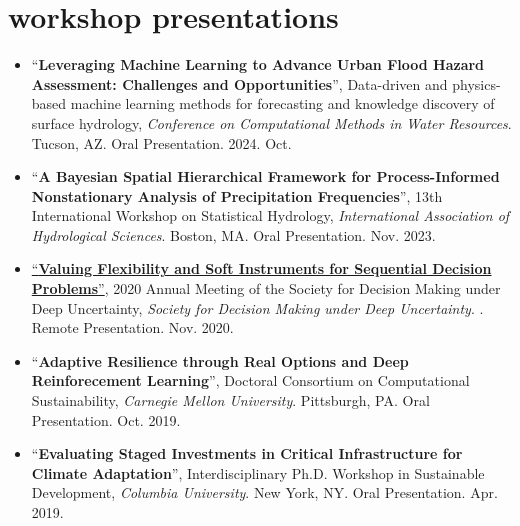 \documentclass[10pt,oneside]{article}
\begin{document}
\mbox{}\vspace{-\dimexpr\baselineskip\relax}
\vspace*{-1em}
\printbibliography[type=inproceedings, heading=none]


\section{workshop presentations}

\mbox{}\vspace{-\dimexpr\baselineskip\relax}

\begin{itemize}[label={}]
  
  \item \enquote{\textbf{Leveraging Machine Learning to Advance Urban Flood Hazard Assessment: Challenges and Opportunities}}, Data-driven and physics-based machine learning methods for forecasting and knowledge discovery of surface hydrology,  \textit{Conference on Computational Methods in Water Resources}. Tucson, AZ. Oral Presentation. 2024. Oct.
        
  \item \enquote{\textbf{A Bayesian Spatial Hierarchical Framework for Process-Informed Nonstationary Analysis of Precipitation Frequencies}}, 13th International Workshop on Statistical Hydrology,  \textit{International Association of Hydrological Sciences}. Boston, MA. Oral Presentation. Nov. 2023.
        
  \item \href{https://2020.deepuncertainty.org/program}{\enquote{\textbf{Valuing Flexibility and Soft Instruments for Sequential Decision Problems}}}, 2020 Annual Meeting of the Society for Decision Making under Deep Uncertainty,  \textit{Society for Decision Making under Deep Uncertainty}. . Remote Presentation. Nov. 2020.
        
  \item \enquote{\textbf{Adaptive Resilience through Real Options and Deep Reinforecement Learning}}, Doctoral Consortium on Computational Sustainability,  \textit{Carnegie Mellon University}. Pittsburgh,  PA. Oral Presentation. Oct. 2019.
        
  \item \enquote{\textbf{Evaluating Staged Investments in Critical Infrastructure for Climate Adaptation}}, Interdisciplinary Ph.D. Workshop in Sustainable Development,  \textit{Columbia University}. New York, NY. Oral Presentation. Apr. 2019.
        

\end{itemize}
\end{document}
